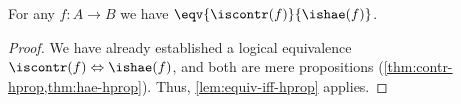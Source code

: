 %
\begin{thm}\label{thm:equiv-contr-hae}
  For any $f:A\to B$ we have $\eqv{\iscontr(f)}{\ishae(f)}$.
\end{thm}

\begin{proof}
  We have already established a logical equivalence ${\iscontr(f)} \Leftrightarrow {\ishae(f)}$, and both are mere propositions (\cref{thm:contr-hprop,thm:hae-hprop}).
  Thus, \cref{lem:equiv-iff-hprop} applies.
\end{proof}
